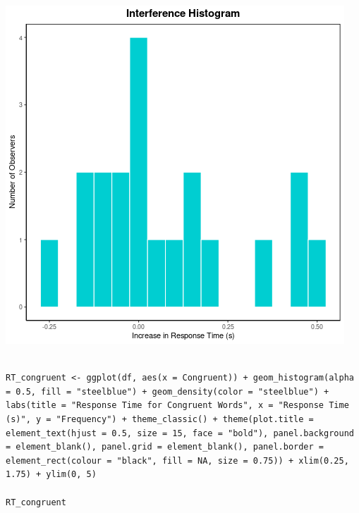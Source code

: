 \documentclass{article}
\begin{document}
\begin{center}
\includegraphics[width=.9\linewidth]{converted_stroop4.png}
\end{center}




\begin{verbatim}

RT_congruent <- ggplot(df, aes(x = Congruent)) + geom_histogram(alpha = 0.5, fill = "steelblue") + geom_density(color = "steelblue") + labs(title = "Response Time for Congruent Words", x = "Response Time (s)", y = "Frequency") + theme_classic() + theme(plot.title = element_text(hjust = 0.5, size = 15, face = "bold"), panel.background = element_blank(), panel.grid = element_blank(), panel.border = element_rect(colour = "black", fill = NA, size = 0.75)) + xlim(0.25, 1.75) + ylim(0, 5)

RT_congruent

\end{verbatim}
\end{document}
